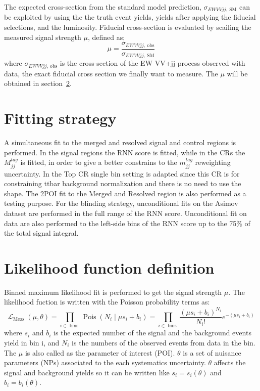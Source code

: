 The expected cross-section from the standard model prediction, $\sigma_{EW VVjj \mathrm{, \ SM}}$ can be exploited by using the the truth event yields, yields after applying the fiducial selections, and the luminosity.
Fiducial cross-section is evaluated by scailing the measured signal strength $\mu$, defined as;
\begin{equation}
\mu = \frac{\sigma_{EW VVjj \mathrm{, \ obs}}}{\sigma_{EW VVjj \mathrm{, \ SM}}}
\end{equation}
where $\sigma_{EW VVjj \mathrm{, \ obs}}$ is the cross-section of the EW VV+jj process observed with data, the exact fiducial cross section we finally want to measure.
The $\mu$ will be obtained in section~\ref{sec:likelihood}.

\section{Fitting strategy}
A simultaneous fit to the merged and resolved signal and control regions is performed. In the signal regions the RNN score is fitted, while in the CRs the $M^{tag}_{jj}$ is fitted, in order to give a better constrains to the $m^{tag}_{jj}$ reweighting uncertainty. In the Top CR single bin setting is adapted since this CR is for constraining ttbar background normalization and there is no need to use the shape. 
The 2POI fit to the Merged and Resolved region is also performed as a testing purpose. For the blinding strategy, unconditional fits on the Asimov dataset are performed in the full range of the RNN score. Unconditional fit on data are also performed to the left-side bins of the RNN score up to the 75\% of the total signal integral.


\section{Likelihood function definition}
\label{sec:likelihood}
Binned maximum likelihood fit is performed to get the signal strength $\mu$. The likelihood fuction is written with the Poisson probability terms as:
\begin{equation}
\mathcal{L}_{\text {Meas }}(\mu, \theta)=\prod_{i \in \text { bins }} \operatorname{Pois}\left(N_{i} \mid \mu s_{i}+b_{i}\right)=\prod_{i \in \text { bins }} \frac{\left(\mu s_{i}+b_{i}\right)^{N_{i}}}{N_{i} !} e^{-\left(\mu s_{i}+b_{i}\right)}
\end{equation}
where $s_i$ and $b_i$ is the expected number of the signal and the background events yield in bin i, and $N_i$ is the numbers of the observed events from data in the bin. The $\mu$ is also called as the parameter of interest (POI). $\theta$ is a set of nuisance parameters (NPs) associated to the each systematics uncertainty. $\theta$ affects the signal and background yields so it can be written like $s_{i}=s_{i}(\theta)$ and $b_{i}=b_{i}(\theta)$. 

